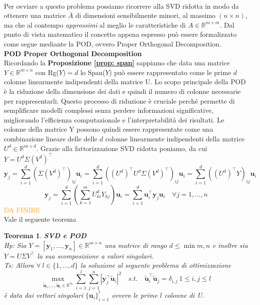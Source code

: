 \documentclass[11pt]{article}
\newtheorem{theorem}{Teorema}
\newcommand{\R}{\mathbb{R}}
\begin{document}
\\
Per ovviare a questo problema possiamo ricorrere alla SVD ridotta in modo da ottenere una matrice $\bar{A}$ di dimensioni sensibilmente minori, al massimo $(n \times n)$, ma che al contempo \textit{approssimi} al meglio le caratteristiche di $A \in \R^{m \times m}$.
Dal punto di vista matematico il concetto appena espresso  può essere formalizzato come segue mediante la POD, ovvero Proper Orthogonal Decomposition. \\
\textbf{POD Proper Orthogonal Decomposition}\\
Ricordando la \textbf{Proposizione \ref{prop: span}} sappiamo che data una matrice \(Y \in \R^{m \times n} \) con Rg(\(Y\))\(=d\) lo Span(\(Y\)) può essere rappresentato come le prime \(d\) colonne linearmente indipendenti della matrice U. Lo scopo principale della POD è la riduzione della dimensione dei dati e quindi il numero di colonne necessarie per rappresentarli. Questo processo di riduzione è cruciale perché permette di semplificare modelli complessi senza perdere informazioni significative, migliorando l'efficienza computazionale e l'interpretabilità dei risultati. 
Le colonne della matrice Y possono quindi essere rappresentate come una combinazione lineare delle delle \(d\) colonne linearmente indipendenti della matrice \(U^d \in \R^{m \times d}\).
Grazie alla fattorizzazione SVD ridotta poniamo, da cui \( Y = U^d \Sigma (V^d)^\top \)
\[
\mathbf{y}_j= \sum_{i=1}^d (\Sigma (V^d)^\top)_{ij} \mathbf{u}_i = \sum_{i=1}^d ((U^d)^\top U^d \Sigma (V^d)^\top)_{ij} \mathbf{u}_i= \sum_{i=1}^d ((U^d)^\top Y)_{ij} \mathbf{u}_i  
\]
\[
\mathbf{y}_j=\sum_{i=1}^d \left( \sum_{k=1}^m U_{ki}^dY_{kj} \right) \mathbf{u}_i = \sum_{i=1}^d \mathbf{u}_i^\top \mathbf{y}_j \mathbf{u}_i 
\quad \forall j=1,\dots,n
\]
\textcolor{orange}{DA FINIRE}\\
Vale il seguente teorema
\begin{theorem}\textbf{SVD e POD}\\
\textit{Hp:} Sia \( Y = [\mathbf{y}_1, \dots, \mathbf{y}_n] \in \R^{m \times n}\) una matrice di rango \(d \leq \min{{m,n}}\) e inoltre sia \(Y=U \Sigma V^\top\) la sua scomposizione a valori singolari.\\
\textit{Ts:} Allora \( \forall \ l \in \{1,\dots,d\} \) la soluzione al seguente problema di ottimizzazione
\[
\max_{\mathbf{\tilde{u}}_1, \dots, \mathbf{\tilde{u}}_l \in \R^m} \sum_{i=1}^l \sum_{j=1}^n | \mathbf{y}_j^\top \mathbf{\tilde{u}}_i |^2 \quad s.t. \quad  \mathbf{\tilde{u}}_i^\top \mathbf{\tilde{u}}_j = \delta_{i,j} \ 1 \leq i,j \leq l
\]
 è data dai vettori singolari \( \{ \mathbf{u}_i\}_{i=1}^l\) ovvero le prime \(l\) colonne di U.
\end{theorem}
\end{document}
